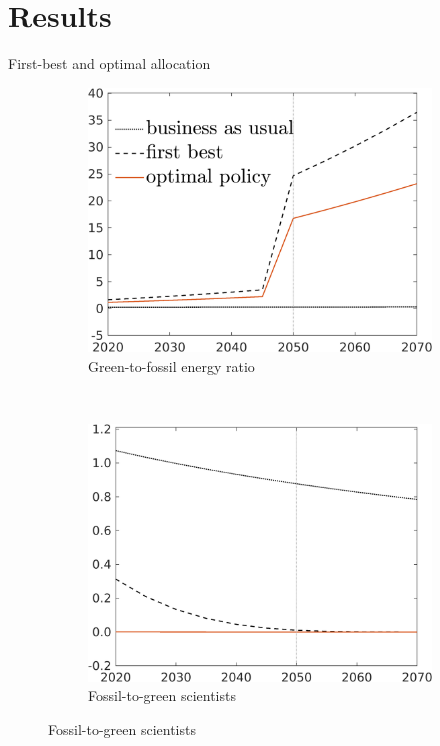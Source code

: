 \documentclass[11pt,aspectratio=169]{beamer}
\begin{document}
	\section*{Results}
\begin{frame}{First-best and optimal allocation}
	\hypertarget{compfb}{}
	\vspace{-3mm}
	\begin{figure}[h!!]
		\centering
		\begin{subfigure}{0.45\textwidth}		
			\caption{Green-to-fossil energy ratio}
			\includegraphics[width=1\textwidth]{../codding_model/own_basedOnFried/optimalPol_010922_revision/figures/all_13Sept22/NewCalib_effBauOpt_T_GFF_Sun2_emnet1_spillover0_knspil3_xgr0_nsk0_sep0_extern0_PV1_etaa0.79_lgd1.png}
		\end{subfigure}
		\begin{minipage}[]{0.05\textwidth}
			\
		\end{minipage}
		\begin{subfigure}{0.45\textwidth}		
			\caption{{Fossil-to-green scientists}}
			\includegraphics[width=1\textwidth]{../codding_model/own_basedOnFried/optimalPol_010922_revision/figures/all_13Sept22/NewCalib_effBauOpt_T_sffsg_Sun2_emnet1_spillover0_knspil3_xgr0_nsk0_sep0_extern0_PV1_etaa0.79_lgd0.png}

\end{subfigure}
\end{figure}
\end{frame}
\end{document}
